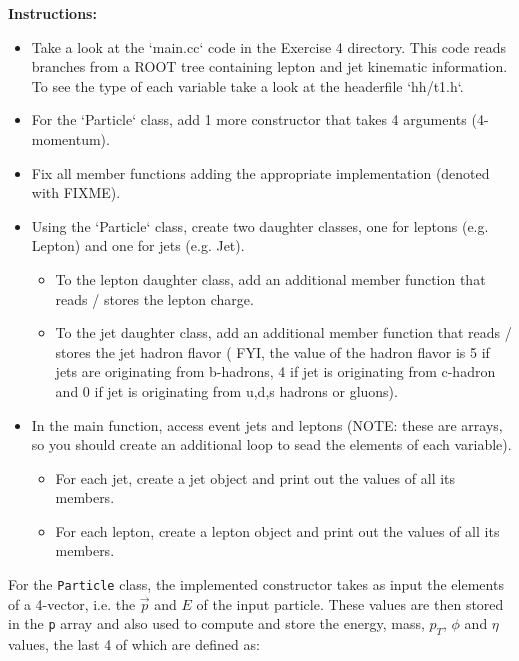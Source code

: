 \documentclass{article}
\newcounter{exercise}
\newenvironment{exr}[1]{%
    \refstepcounter{exercise}
    \begin{tcolorbox}[colback=blue!5!white, colframe=blue!75!black, title=Exercise \theexercise]
    \textbf{Instructions:} #1
    \end{tcolorbox}
    \vspace{1em}
}{}
\begin{document}
\begin{exr}{
    \begin{itemize}
        \item Take a look at the `main.cc` code in the Exercise 4 directory. This code reads branches from a ROOT tree containing lepton and jet kinematic information. To see the type of each variable take a look at the headerfile `hh/t1.h`.
        \item For the `Particle` class, add 1 more constructor that takes 4 arguments (4-momentum).
        \item Fix all member functions adding the appropriate implementation (denoted with FIXME).
        \item Using the `Particle` class, create two daughter classes, one for leptons (e.g. Lepton) and one for jets (e.g. Jet).
        \begin{itemize}
            \item To the lepton daughter class, add an additional member function that reads / stores the lepton charge.
            \item To the jet daughter class, add an additional member function that reads / stores the jet hadron flavor ( FYI, the value of the hadron flavor is 5 if jets are originating from b-hadrons, 4 if jet is originating from c-hadron and 0 if jet is originating from u,d,s hadrons or gluons).
        \end{itemize}
        \item In the main function, access event jets and leptons (NOTE: these are arrays, so you should create an additional loop to sead the elements of each variable).
        \begin{itemize}
            \item For each jet, create a jet object and print out the values of all its members.
            \item For each lepton, create a lepton object and print out the values of all its members.
        \end{itemize}
    \end{itemize}
    }
\end{exr}

For the \texttt{Particle} class, the implemented constructor takes as input the elements of a 4-vector, i.e. the $\vec p$ and $E$ of the input particle. These values are then stored in the \texttt{p} array and also used to compute and store the energy, mass, $p_T$, $\phi$ and $\eta$ values, the last 4 of which are defined as:
\end{document}
